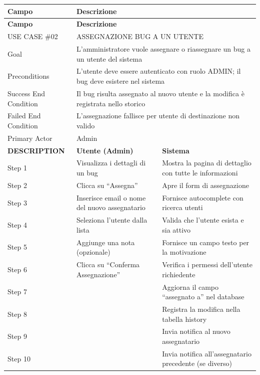 \begin{longtable}{|p{3cm}|p{7cm}|p{5.5cm}|}
\hline
\textbf{Campo} & \multicolumn{2}{p{12.5cm}|}{\textbf{Descrizione}} \\
\hline
\endfirsthead
\hline
\textbf{Campo} & \multicolumn{2}{p{12.5cm}|}{\textbf{Descrizione}} \\
\hline
\endhead
\hline
\endfoot
\hline
\endlastfoot

USE CASE \#02 & \multicolumn{2}{p{12.5cm}|}{ASSEGNAZIONE BUG A UN UTENTE} \\
\hline
Goal & \multicolumn{2}{p{12.5cm}|}{L'amministratore vuole assegnare o riassegnare un bug a un utente del sistema} \\
\hline
Preconditions & \multicolumn{2}{p{12.5cm}|}{L'utente deve essere autenticato con ruolo ADMIN; il bug deve esistere nel sistema} \\
\hline
Success End Condition & \multicolumn{2}{p{12.5cm}|}{Il bug risulta assegnato al nuovo utente e la modifica è registrata nello storico} \\
\hline
Failed End Condition & \multicolumn{2}{p{12.5cm}|}{L'assegnazione fallisce per utente di destinazione non valido} \\
\hline
Primary Actor & \multicolumn{2}{p{12.5cm}|}{Admin} \\
\hline\hline
\textbf{DESCRIPTION} & \textbf{Utente (Admin)} & \textbf{Sistema} \\
\hline
Step 1 & Visualizza i dettagli di un bug & Mostra la pagina di dettaglio con tutte le informazioni \\
\hline
Step 2 & Clicca su ``Assegna'' & Apre il form di assegnazione \\
\hline
Step 3 & Inserisce email o nome del nuovo assegnatario & Fornisce autocomplete con ricerca utenti \\
\hline
Step 4 & Seleziona l'utente dalla lista & Valida che l'utente esista e sia attivo \\
\hline
Step 5 & Aggiunge una nota (opzionale) & Fornisce un campo testo per la motivazione \\
\hline
Step 6 & Clicca su ``Conferma Assegnazione'' & Verifica i permessi dell'utente richiedente \\
\hline
Step 7 & & Aggiorna il campo ``assegnato a'' nel database \\
\hline
Step 8 & & Registra la modifica nella tabella history \\
\hline
Step 9 & & Invia notifica al nuovo assegnatario \\
\hline
Step 10 & & Invia notifica all'assegnatario precedente (se diverso) \\

\end{longtable}
